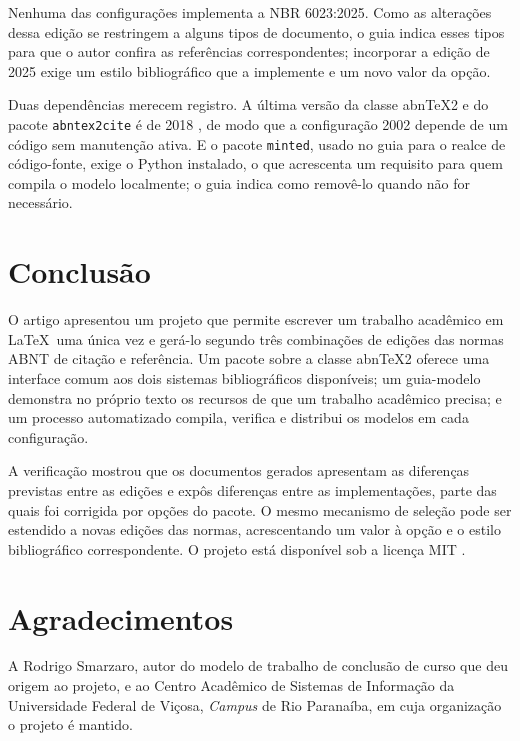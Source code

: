 \documentclass[
	article,
	12pt,
	oneside,
	a4paper,
	english,
	brazil,
]{abntex2}
\begin{document}
Nenhuma das configurações implementa a NBR 6023:2025. Como as alterações dessa edição se restringem a alguns tipos de documento, o guia indica esses tipos para que o autor confira as referências correspondentes; incorporar a edição de 2025 exige um estilo bibliográfico que a implemente e um novo valor da opção.

Duas dependências merecem registro. A última versão da classe abn\TeX2 e do pacote \texttt{abntex2cite} é de 2018 \cite{ctan-abntex2}, de modo que a configuração 2002 depende de um código sem manutenção ativa. E o pacote \texttt{minted}, usado no guia para o realce de código-fonte, exige o Python instalado, o que acrescenta um requisito para quem compila o modelo localmente; o guia indica como removê-lo quando não for necessário.

\section{Conclusão}\label{sec:conclusao}

O artigo apresentou um projeto que permite escrever um trabalho acadêmico em \LaTeX\ uma única vez e gerá-lo segundo três combinações de edições das normas ABNT de citação e referência. Um pacote sobre a classe abn\TeX2 oferece uma interface comum aos dois sistemas bibliográficos disponíveis; um guia-modelo demonstra no próprio texto os recursos de que um trabalho acadêmico precisa; e um processo automatizado compila, verifica e distribui os modelos em cada configuração.

A verificação mostrou que os documentos gerados apresentam as diferenças previstas entre as edições e expôs diferenças entre as implementações, parte das quais foi corrigida por opções do pacote. O mesmo mecanismo de seleção pode ser estendido a novas edições das normas, acrescentando um valor à opção e o estilo bibliográfico correspondente. O projeto está disponível sob a licença MIT \cite{modeloufv}.

\postextual

\section*{Agradecimentos}

A Rodrigo Smarzaro, autor do modelo de trabalho de conclusão de curso que deu origem ao projeto, e ao Centro Acadêmico de Sistemas de Informação da Universidade Federal de Viçosa, \textit{Campus} de Rio Paranaíba, em cuja organização o projeto é mantido.

\imprimirreferencias
\end{document}
